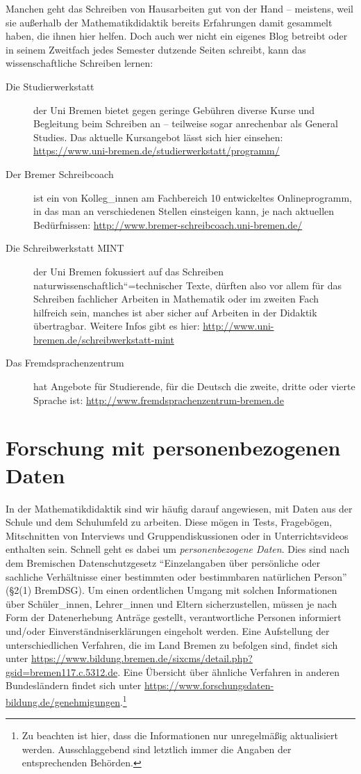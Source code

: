 \documentclass[ngerman,oneside,12pt,a4paper]{scrbook}
\begin{document}
Manchen geht das Schreiben von Hausarbeiten gut von der Hand --
meistens, weil sie außerhalb der Mathematikdidaktik bereits Erfahrungen
damit gesammelt haben, die ihnen hier helfen. Doch auch wer nicht ein
eigenes Blog betreibt oder in seinem Zweitfach jedes Semester dutzende
Seiten schreibt, kann das wissenschaftliche Schreiben lernen:

\begin{description}
\item[Die Studierwerkstatt]
der Uni Bremen bietet gegen geringe Gebühren diverse Kurse und
Begleitung beim Schreiben an -- teilweise sogar anrechenbar als General
Studies. Das aktuelle Kursangebot lässt sich hier einsehen:
\url{https://www.uni-bremen.de/studierwerkstatt/programm/}
\item[Der Bremer Schreibcoach]
ist ein von Kolleg\_innen am Fachbereich 10 entwickeltes Onlineprogramm,
in das man an verschiedenen Stellen einsteigen kann, je nach aktuellen
Bedürfnissen: \url{http://www.bremer-schreibcoach.uni-bremen.de/}
\item[Die Schreibwerkstatt MINT]
der Uni Bremen fokussiert auf das Schreiben
naturwissenschaftlich``=technischer Texte, dürften also vor allem für
das Schreiben fachlicher Arbeiten in Mathematik oder im zweiten Fach
hilfreich sein, manches ist aber sicher auf Arbeiten in der Didaktik
übertragbar. Weitere Infos gibt es hier:
\url{http://www.uni-bremen.de/schreibwerkstatt-mint}
\item[Das Fremdsprachenzentrum]
hat Angebote für Studierende, für die Deutsch die zweite, dritte oder
vierte Sprache ist: \url{http://www.fremdsprachenzentrum-bremen.de}
\end{description}

\chapter{Forschung mit personenbezogenen
Daten}\label{forschung-mit-personenbezogenen-daten}

In der Mathematikdidaktik sind wir häufig darauf angewiesen, mit Daten
aus der Schule und dem Schulumfeld zu arbeiten. Diese mögen in Tests,
Fragebögen, Mitschnitten von Interviews und Gruppendiskussionen oder in
Unterrichtsvideos enthalten sein. Schnell geht es dabei um
\emph{personenbezogene Daten}. Dies sind nach dem Bremischen
Datenschutzgesetz \enquote{Einzelangaben über persönliche oder sachliche
Verhältnisse einer bestimmten oder bestimmbaren natürlichen Person}
(§2(1) BremDSG). Um einen ordentlichen Umgang mit solchen Informationen
über Schüler\_innen, Lehrer\_innen und Eltern sicherzustellen, müssen je
nach Form der Datenerhebung Anträge gestellt, verantwortliche Personen
informiert und/oder Einverständniserklärungen eingeholt werden. Eine
Aufstellung der unterschiedlichen Verfahren, die im Land Bremen zu
befolgen sind, findet sich unter
\url{https://www.bildung.bremen.de/sixcms/detail.php?gsid=bremen117.c.5312.de}.
Eine Übersicht über ähnliche Verfahren in anderen Bundesländern findet
sich unter
\url{https://www.forschungsdaten-bildung.de/genehmigungen}.\footnote{Zu
  beachten ist hier, dass die Informationen nur unregelmäßig
  aktualisiert werden. Ausschlaggebend sind letztlich immer die Angaben
  der entsprechenden Behörden.}
\end{document}
